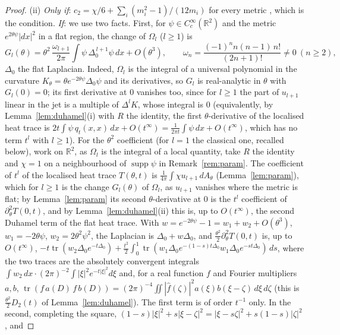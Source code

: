\documentclass[pdflatex,sn-mathphys-num]{sn-jnl}
\theoremstyle{thmstyleone}%
\theoremstyle{thmstylethree}%
\newcommand{\R}{\mathbb{R}}
\begin{document}
\begin{proof}
(ii) \emph{Only if}: $c_2=\chi/6+\sum_i(m_i^2-1)/(12m_i)$ for every metric \cite[(5.7)]{dggw2008}, which is the condition. \emph{If}: we use two facts. First, for $\psi\in C_c^\infty(\R^2)$ and the metric $e^{2\theta\psi}|dx|^2$ in a flat region, the change of $\Omega_l$ ($l\ge1$) is
\[
G_l(\theta)=\theta^2\,\frac{\omega_{l+1}}{2\pi}\int\psi\,\Delta_0^{\,l+1}\psi\,dx+O(\theta^3),\qquad \omega_n=\frac{(-1)^nn(n-1)\,n!}{(2n+1)!}\ne0\ (n\ge2),
\]
$\Delta_0$ the flat Laplacian. Indeed, $\Omega_l$ is the integral of a universal polynomial in the curvature $K_\theta=\theta e^{-2\theta\psi}\Delta_0\psi$ and its derivatives, so $G_l$ is real-analytic in $\theta$ with $G_l(0)=0$; its first derivative at $0$ vanishes too, since for $l\ge1$ the part of $u_{l+1}$ linear in the jet is a multiple of $\Delta^lK$, whose integral is $0$ (equivalently, by Lemma~\ref{lem:duhamel}(i) with $R$ the identity, the first $\theta$-derivative of the localised heat trace is $2t\int\psi\,q_t(x,x)\,dx+O(t^\infty)=\frac1{2\pi t}\int\psi\,dx+O(t^\infty)$, which has no term $t^l$ with $l\ge1$). For the $\theta^2$ coefficient (for $l=1$ the classical one, recalled below), work on $\R^2$, as $\Omega_l$ is the integral of a local quantity, take $R$ the identity and $\chi=1$ on a neighbourhood of $\operatorname{supp}\psi$ in Remark~\ref{rem:param}. The coefficient of $t^l$ of the localised heat trace $T(\theta,t)$ is $\frac1{4\pi}\int\chi u_{l+1}\,dA_\theta$ (Lemma~\ref{lem:param}), which for $l\ge1$ is the change $G_l(\theta)$ of $\Omega_l$, as $u_{l+1}$ vanishes where the metric is flat; by Lemma~\ref{lem:param} its second $\theta$-derivative at $0$ is the $t^l$ coefficient of $\partial_\theta^2T(0,t)$, and by Lemma~\ref{lem:duhamel}(ii) this is, up to $O(t^\infty)$, the second Duhamel term of the flat heat trace. With $w=e^{-2\theta\psi}-1=w_1+w_2+O(\theta^3)$, $w_1=-2\theta\psi$, $w_2=2\theta^2\psi^2$, the Laplacian is $\Delta_0+w\Delta_0$, and $\frac{\theta^2}2\partial_\theta^2T(0,t)$ is, up to $O(t^\infty)$, $-t\operatorname{tr}(w_2\Delta_0e^{-t\Delta_0})+\frac{t^2}2\int_0^1\operatorname{tr}(w_1\Delta_0e^{-(1-s)t\Delta_0}w_1\Delta_0e^{-st\Delta_0})\,ds$, where the two traces are the absolutely convergent integrals $\int w_2\,dx\cdot(2\pi)^{-2}\int|\xi|^2e^{-t|\xi|^2}d\xi$ and, for a real function $f$ and Fourier multipliers $a,b$, $\operatorname{tr}(f\,a(D)\,f\,b(D))=(2\pi)^{-4}\iint|\hat f(\zeta)|^2a(\xi)b(\xi-\zeta)\,d\xi\,d\zeta$ (this is $\frac{\theta^2}2D_2(t)$ of Lemma~\ref{lem:duhamel}). The first term is of order $t^{-1}$ only. In the second, completing the square, $(1-s)|\xi|^2+s|\xi-\zeta|^2=|\xi-s\zeta|^2+s(1-s)|\zeta|^2$, and

\end{proof}
\end{document}
